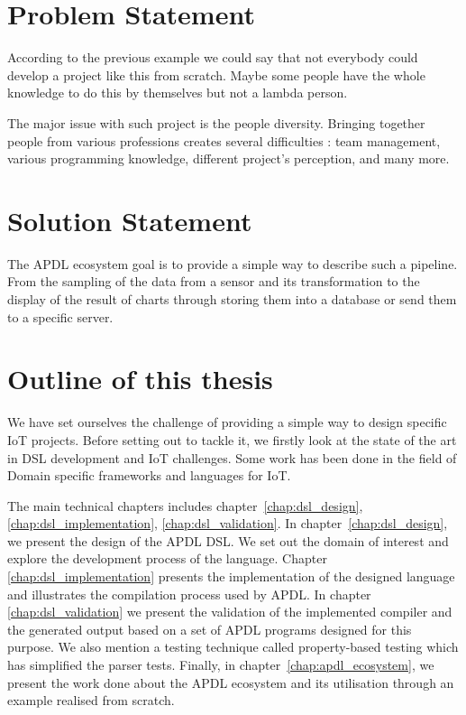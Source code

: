 \section{Problem Statement}
\label{sec:intro-problem-statement}

According to the previous example we could say that not everybody could develop
a project like this from scratch. Maybe some people have the whole knowledge to
do this by themselves but not a lambda person.

The major issue with such project is the people diversity. Bringing together people from various
professions creates several difficulties : team management, various programming knowledge, different
project's perception, and many more.

\section{Solution Statement}
\label{sec:intro-solution-statement}

The \gls{APDL} ecosystem goal is to
provide a simple way to describe such a pipeline. From the sampling of the data
from a sensor and its transformation to the display of the result of charts through
storing them into a database or send them to a specific server.

\section{Outline of this thesis}
\label{sec:intro-roadmap}

We have set ourselves the challenge of providing a simple way to design specific
\gls{IoT} projects. Before setting out to tackle it, we firstly look at the state
of the art in \gls{DSL} development and \gls{IoT} challenges. Some work has
been done in the field of Domain specific frameworks and languages for \gls{IoT}.

The main technical chapters includes chapter~\ref{chap:dsl_design},
\ref{chap:dsl_implementation}, \ref{chap:dsl_validation}. In
chapter~\ref{chap:dsl_design}, we present the design of the \gls{APDL}
\gls{DSL}. We set out the domain of interest and explore the development process
of the language. Chapter \ref{chap:dsl_implementation} presents the
implementation of the designed language and illustrates the compilation process
used by \gls{APDL}. In chapter \ref{chap:dsl_validation} we present the
validation of the implemented compiler and the generated output based on a set
of APDL programs designed for this purpose. We also mention a testing
technique called property-based testing which has simplified the parser tests.
Finally, in chapter~\ref{chap:apdl_ecosystem}, we present the work done about
the APDL ecosystem and its utilisation through an example realised from scratch.

